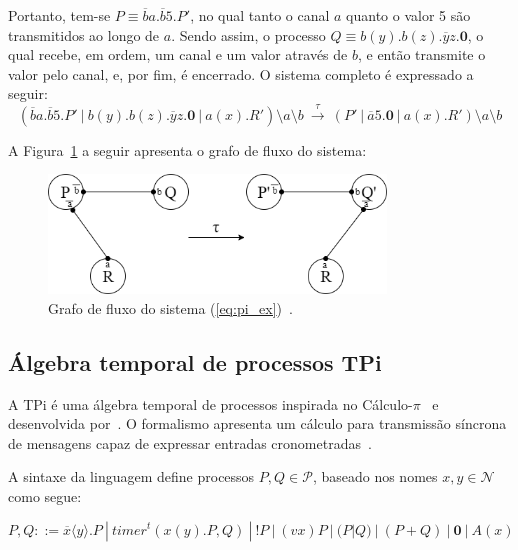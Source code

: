 Portanto, tem-se $P \equiv \overline{b}a.\overline{b}5.P'$, no qual tanto o canal $a$ quanto o valor 5 são transmitidos ao longo de $a$. Sendo assim, o processo $Q \equiv b(y).b(z).\overline{y}z.\textbf{0}$, o qual recebe, em ordem, um canal e um valor através de $b$, e então transmite o valor pelo canal, e, por fim, é encerrado. O sistema completo é expressado a seguir:
\begin{equation} \label{eq:pi_ex}
 (\overline{b}a.\overline{b}5.P'~|~b(y).b(z).\overline{y}z.\textbf{0}~|~a(x).R')\setminus a \setminus b ~ \stackrel{\tau}{\longrightarrow} ~ (P'~|~\overline{a}5.\textbf{0}~|~a(x).R')\setminus a \setminus b
\end{equation}

A Figura~\ref{fig:pi_graph} a seguir apresenta o grafo de fluxo do sistema:

\begin{figure}[ht]
	\centering
	\includegraphics[width=0.8\textwidth]{imagens/calc_pi_ex.png}
	\caption{Grafo de fluxo do sistema (\ref{eq:pi_ex})~\cite{milner1992calculus}.
		\label{fig:pi_graph}}
\end{figure}
\FloatBarrier

\subsection{Álgebra temporal de processos TPi}
    
A TPi é uma álgebra temporal de processos inspirada no Cálculo-$\pi$~\cite{milner1992calculus, milner1992calculus2} e desenvolvida por~\citeauthor{berger2003two}. O formalismo apresenta um cálculo para transmissão síncrona de mensagens capaz de expressar entradas cronometradas~\cite{aziz2016formal}.

A sintaxe da linguagem define processos $P, Q \in \mathcal{P}$, baseado nos nomes $x, y \in \mathcal{N}$ como segue:

\begin{equation}
P, Q ::= \overline{x}\langle y \rangle.P~|~
timer^{t}(x(y).P,Q)~|~
!P~|~
(vx)P~|~
(P|Q)~|~
(P+Q)~|~
\textbf{0}~|~
A(x)
\end{equation}

